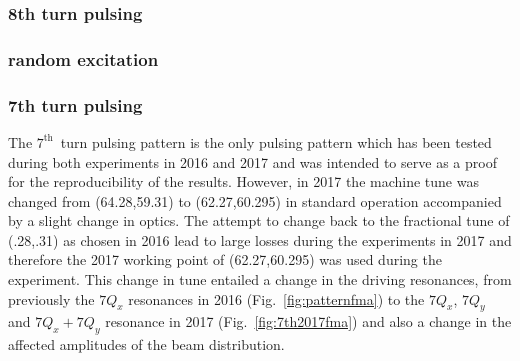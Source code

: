 \documentclass[%
 reprint,
 amsmath,amssymb,
 aps,
prstab,
]{revtex4-1}
\begin{document}
\subsubsection{8th turn pulsing\label{sec:simex8}}
\subsubsection{random excitation\label{sec:simexran}}

\subsubsection{7th turn pulsing\label{sec:simex7}}
The $7^{\mathrm{th}}$~turn pulsing pattern is the only pulsing pattern which has been tested during both experiments in 2016 and 2017 and was intended to serve as a proof for the reproducibility of the results. However, in 2017 the machine tune was changed from (64.28,59.31) to (62.27,60.295) in standard operation accompanied by a slight change in optics. The attempt to change back to the fractional tune of (.28,.31) as chosen in 2016 lead to large losses during the experiments in 2017 and therefore the 2017 working point of (62.27,60.295) was used during the experiment. This change in tune entailed a change in the driving resonances, from previously the $7Q_x$ resonances in 2016  (Fig.~\ref{fig:patternfma}) to the $7Q_x$, $7Q_y$ and $7Q_x + 7Q_y$ resonance in 2017 (Fig.~\ref{fig:7th2017fma}) and also a change in the affected amplitudes of the beam distribution.
\end{document}
